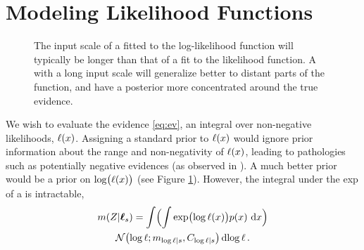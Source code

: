 \documentclass{article}
\begin{document}
\section{Modeling Likelihood Functions}\label{sec:model_lik}
%
 \begin{figure}
 \centering
 \caption{The input scale of a \gpb fitted to the log-likelihood function will typically be longer than that of a \gpb fit to the likelihood function.  A \gpb with a long input scale will generalize better to distant parts of the function, and have a posterior more concentrated around the true evidence. }
 \label{fig:log_is_better}
 \end{figure}
%
We wish to evaluate the evidence \eqref{eq:ev}, an integral over non-negative likelihoods, $\lfn(\lfv)$. Assigning a standard \gpb prior to $\lfn(\lfv)$ would ignore prior information about the range and non-negativity of $\lfn(\lfv)$, leading to pathologies such as potentially negative evidences (as observed in \citet{BZMonteCarlo}).  A much better prior would be a \gpb prior on $\log\bigl(\lfn(x)\bigr)$ (see Figure \ref{fig:log_is_better}). However, the integral under the exp of a \gpb is intractable,
\begin{multline}\label{eq:minty_l}
\mean{\If}{\vr_s}
 =\int \Bigl( \int \exp\bigl(\tr(\lfv)\bigr)\po{\lfv}\,\ud\lfv\Bigr)\\
\N{\tr}{\meancondfn{\tr}{s}}{C_{\tr|s}} \ud \tr\,.
\end{multline}
\end{document}
